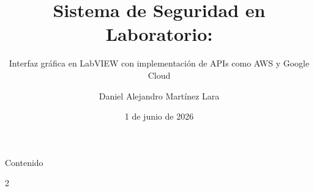 \documentclass[aspectratio=169,10pt]{beamer}
\title{Sistema de Seguridad en Laboratorio:}
\subtitle{Interfaz gráfica en LabVIEW con implementación de APIs como AWS y Google Cloud}
\author{Daniel Alejandro Martínez Lara}
\institute{IICO-UASLP}
\date{1 de junio de 2026}
\begin{document}
\begin{frame}
\titlepage
\end{frame}
\begin{frame}[t]{Contenido}{}
     \begin{multicols}{2}
     \tableofcontents
     \end{multicols}
     \end{frame}
 




\end{document}
